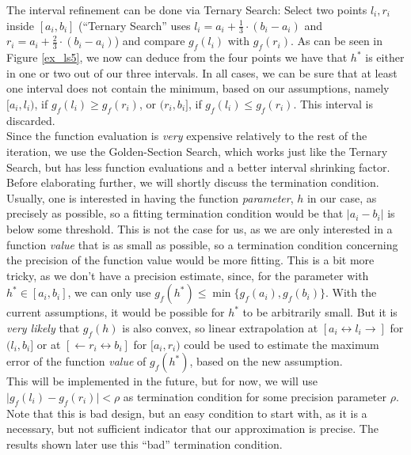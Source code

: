The interval refinement can be done via Ternary Search: Select two points $l_i,r_i$ inside $[a_i,b_i]$ (``Ternary Search'' uses $l_i=a_i+\frac{1}{3}\cdot (b_i-a_i)$ and $r_i=a_i+\frac{2}{3}\cdot (b_i-a_i)$) and compare $g_f(l_i)$ with $g_f(r_i)$. As can be seen in Figure \ref{ex_ls5}, we now can deduce from the four points we have that $h^*$ is either in one or two out of our three intervals. In all cases, we can be sure that at least one interval does not contain the minimum, based on our assumptions, namely $[a_i,l_i)$, if $g_f(l_i)\geq g_f(r_i)$, or $(r_i,b_i]$, if $g_f(l_i)\leq g_f(r_i)$. This interval is discarded.\\
Since the function evaluation is \textit{very} expensive relatively to the rest of the iteration, we use the Golden-Section Search, which works just like the Ternary Search, but has less function evaluations and a better interval shrinking factor. \\
Before elaborating further, we will shortly discuss the termination condition.
Usually, one is interested in having the function \textit{parameter}, $h$ in our case, as precisely as possible, so a fitting termination condition would be that $\vert a_i-b_i\vert$ is below some threshold. This is not the case for us, as we are only interested in a function \textit{value} that is as small as possible, so a termination condition concerning the precision of the function value would be more fitting. This is a bit more tricky, as we don't have a precision estimate, since, for the parameter with $h^*\in[a_i,b_i]$, we can only use $g_f(h^*)\leq \min\{g_f(a_i),g_f(b_i)\}$. With the current assumptions, it would be possible for $h^*$ to be arbitrarily small. But it is \textit{very likely} that $g_f(h)$ is also convex, so linear extrapolation at $[a_i\leftrightarrow l_i\rightarrow]$ for $(l_i,b_i]$ or at $[\leftarrow r_i\leftrightarrow b_i]$ for $[a_i,r_i)$ could be used to estimate the maximum error of the function \textit{value} of $g_f(h^*)$, based on the new assumption.\\
This will be implemented in the future, but for now, we will use $\vert g_f(l_i)-g_f(r_i)\vert<\rho$ as termination condition for some precision parameter $\rho$. Note that this is bad design, but an easy condition to start with, as it is a necessary, but not sufficient indicator that our approximation is precise. The results shown later use this ``bad'' termination condition.
